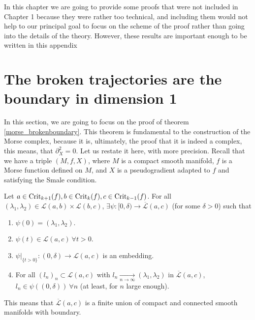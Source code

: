 In this chapter we are going to provide some proofs that were not included in Chapter 1 because they were rather too technical, and including them would not help to our principal goal to focus on the scheme of the proof rather than going into the details of the theory. However, these results are important enough to be written in this appendix

\section{The broken trajectories are the boundary in dimension 1}

In this section, we are going to focus on the proof of theorem \ref{morse_brokenboundary}. This theorem is fundamental to the construction of the Morse complex, because it is, ultimately, the proof that it is indeed a complex, this means, that $\partial_X^2 = 0$. Let us restate it here, with more precision. Recall that we have a triple $(M, f, X)$, where $M$ is a compact smooth manifold, $f$ is a Morse function defined on $M$, and $X$ is a pseudogradient adapted to $f$ and satisfying the Smale condition.

\begin{theo}
Let $a \in \text{Crit}_{k+1}(f), b \in \text{Crit}_k(f), c \in \text{Crit}_{k-1}(f)$. For all $(\lambda_1,\lambda_2) \in \mathcal{L}(a,b) \times \mathcal{L}(b,c)$, $\exists \psi : [0,\delta) \rightarrow \overline{\mathcal{L}}(a,c)$ (for some $\delta > 0$) such that

\begin{enumerate}
	\item $\psi(0) = (\lambda_1,\lambda_2)$.
	\item $\psi(t) \in \mathcal{L}(a,c) \ \forall t > 0$.
	\item $\left. \psi \right|_{\{t > 0\}} : (0,\delta) \rightarrow \mathcal{L}(a,c)$ is an embedding.
	\item For all $(l_n)_n \subset \mathcal{L}(a,c)$ with $l_n \xrightarrow[n \rightarrow \infty]{} (\lambda_1, \lambda_2)$ in $\overline{\mathcal{L}}(a,c)$, $l_n \in \psi((0,\delta)) \ \forall n$ (at least, for $n$ large enough).
\end{enumerate}

This means that $\overline{\mathcal{L}}(a,c)$ is a finite union of compact and connected smooth manifolds with boundary.
\end{theo}

